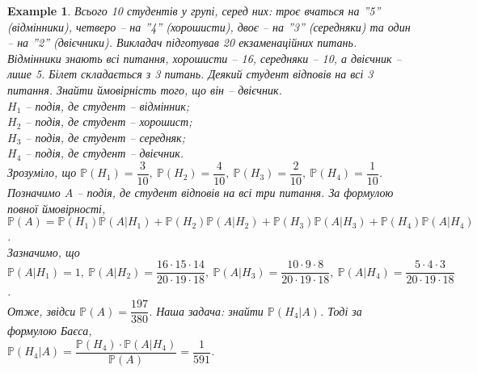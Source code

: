 \documentclass[a4paper, 10pt]{article}
\theoremstyle{theoremdd}
\newtheorem{example}[theorem]{Example}
\begin{document}
\begin{example}
Всього 10 студентів у групі, серед них: троє вчаться на ''5'' (відмінники), четверо -- на ''4'' (хорошисти), двоє -- на ''3'' (середняки) та один -- на ''2'' (двієчники). Викладач підготував 20 екзаменаційних питань. Відмінники знають всі питання, хорошисти -- 16, середняки -- 10, а двієчник -- лише 5. Білет складається з 3 питань. Деякий студент відповів на всі 3 питання. Знайти ймовірність того, що він -- двієчник.\\
$H_1$ -- подія, де студент -- відмінник;\\
$H_2$ -- подія, де студент -- хорошист;\\
$H_3$ -- подія, де студент -- середняк;\\
$H_4$ -- подія, де студент -- двієчник.\\
Зрозуміло, що $\mathbb{P}(H_1) = \dfrac{3}{10},\ \mathbb{P}(H_2) = \dfrac{4}{10},\ \mathbb{P}(H_3) = \dfrac{2}{10},\ \mathbb{P}(H_4) = \dfrac{1}{10}$.\\
Позначимо $A$ -- подія, де студент відповів на всі три питання. За формулою повної ймовірності,\\
$\mathbb{P}(A) = \mathbb{P}(H_1) \mathbb{P}(A | H_1) + \mathbb{P}(H_2) \mathbb{P}(A | H_2) + \mathbb{P}(H_3) \mathbb{P}(A | H_3) + \mathbb{P}(H_4) \mathbb{P}(A | H_4)$.\\
Зазначимо, що $\mathbb{P}(A|H_1) = 1,\ \mathbb{P}(A|H_2) = \dfrac{16 \cdot 15 \cdot 14}{20 \cdot 19 \cdot 18},\ \mathbb{P}(A|H_3) = \dfrac{10 \cdot 9 \cdot 8}{20 \cdot 19 \cdot 18},\ \mathbb{P}(A|H_4) = \dfrac{5 \cdot 4 \cdot 3}{20 \cdot 19 \cdot 18}$.\\
Отже, звідси $\mathbb{P}(A) = \dfrac{197}{380}$. Наша задача: знайти $\mathbb{P}(H_4 | A)$. Тоді за формулою Баєса,\\
$\mathbb{P}(H_4 | A) = \dfrac{\mathbb{P}(H_4) \cdot \mathbb{P}(A|H_4)}{\mathbb{P}(A)} = \dfrac{1}{591}$.
\end{example}
\end{document}

